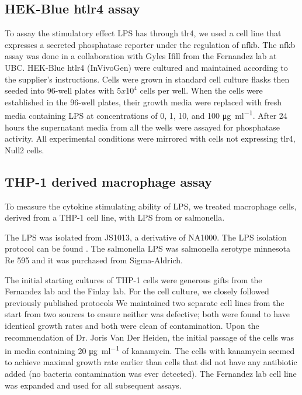 \subsection{HEK-Blue h\ac{tlr4} assay}\label{sec:hek-blue-htlr4}
To assay the stimulatory effect \caulobacter{} \ac{LPS}  has through \ac{tlr4}, we used a cell line that expresses a secreted phosphatase reporter under the regulation of \ac{nfkb}.
The \ac{nfkb} assay was done in a collaboration with Gyles Ifill from the Fernandez lab at UBC. HEK-Blue h\ac{tlr4}\texttrademark{} (InVivoGen) were cultured and maintained according to the supplier's instructions. Cells were grown in standard cell culture flasks then seeded into 96-well plates with $5x10^{4}$ cells per well. When the cells were established in the 96-well plates, their growth media were replaced with fresh media containing \ac{LPS} at concentrations of 0, 1, 10, and 100 \si{\micro\gram\per\milli\litre}. After 24 hours the supernatant media from all the wells were assayed for phosphatase activity. All experimental conditions were mirrored with cells not expressing \ac{tlr4}, Null2 cells\texttrademark{}.
      
\subsection{THP-1 derived macrophage assay} \label{sec:thp-1-derived}
To measure the cytokine stimulating ability of \caulobacter{} \ac{LPS}, we treated macrophage cells, derived from a THP-1 cell line, with \ac{LPS} from \caulobacter{} or \ac{salmonella}. 
      
The \caulobacter{} \ac{LPS} was isolated from \caulobacter{} JS1013, a derivative of NA1000. The \ac{LPS} isolation protocol can be found . The \ac{salmonella} \ac{LPS} was \ac{salmonella} serotype minnesota Re 595 and it was purchased from Sigma-Aldrich.
      
The initial starting cultures of THP-1 cells were generous gifts from the Fernandez lab and the Finlay lab. For the cell culture, we closely followed previously published protocols We maintained two separate cell lines from the start from two sources to ensure neither was defective; both were found to have identical growth rates and both were clean of contamination. Upon the recommendation of Dr. Joris Van Der Heiden, the initial passage of the cells was in media containing 20 \si{\micro\gram\per\milli\litre} of kanamycin. The cells with kanamycin seemed to achieve maximal growth rate earlier than cells that did not have any antibiotic added (no bacteria contamination was ever detected). The Fernandez lab cell line was expanded and used for all subsequent assays.
      

